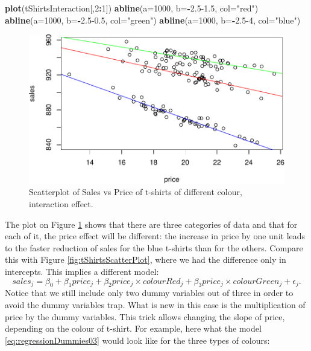 \documentclass[
]{book}
\newenvironment{Shaded}{\begin{snugshade}}{\end{snugshade}}
\newcommand{\DataTypeTok}[1]{\textcolor[rgb]{0.13,0.29,0.53}{#1}}
\newcommand{\DecValTok}[1]{\textcolor[rgb]{0.00,0.00,0.81}{#1}}
\newcommand{\FloatTok}[1]{\textcolor[rgb]{0.00,0.00,0.81}{#1}}
\newcommand{\KeywordTok}[1]{\textcolor[rgb]{0.13,0.29,0.53}{\textbf{#1}}}
\newcommand{\NormalTok}[1]{#1}
\newcommand{\OperatorTok}[1]{\textcolor[rgb]{0.81,0.36,0.00}{\textbf{#1}}}
\newcommand{\StringTok}[1]{\textcolor[rgb]{0.31,0.60,0.02}{#1}}
\theoremstyle{definition}
\theoremstyle{definition}
\theoremstyle{definition}
\theoremstyle{definition}
\theoremstyle{remark}
\begin{document}
\begin{Shaded}
\begin{Highlighting}[]
\KeywordTok{plot}\NormalTok{(tShirtsInteraction[,}\DecValTok{2}\OperatorTok{:}\DecValTok{1}\NormalTok{])}
\KeywordTok{abline}\NormalTok{(}\DataTypeTok{a=}\DecValTok{1000}\NormalTok{, }\DataTypeTok{b=}\OperatorTok{{-}}\FloatTok{2.5{-}1.5}\NormalTok{, }\DataTypeTok{col=}\StringTok{"red"}\NormalTok{)}
\KeywordTok{abline}\NormalTok{(}\DataTypeTok{a=}\DecValTok{1000}\NormalTok{, }\DataTypeTok{b=}\OperatorTok{{-}}\FloatTok{2.5{-}0.5}\NormalTok{, }\DataTypeTok{col=}\StringTok{"green"}\NormalTok{)}
\KeywordTok{abline}\NormalTok{(}\DataTypeTok{a=}\DecValTok{1000}\NormalTok{, }\DataTypeTok{b=}\OperatorTok{{-}}\FloatTok{2.5}\DecValTok{{-}4}\NormalTok{, }\DataTypeTok{col=}\StringTok{"blue"}\NormalTok{)}
\end{Highlighting}
\end{Shaded}

\begin{figure}
\centering
\includegraphics{Svetunkov---Statistics-for-Business-Analytics_files/figure-latex/tShirtsInteractionScatterPlot-1.pdf}
\caption{\label{fig:tShirtsInteractionScatterPlot}Scatterplot of Sales vs Price of t-shirts of different colour, interaction effect.}
\end{figure}

The plot on Figure \ref{fig:tShirtsInteractionScatterPlot} shows that there are three categories of data and that for each of it, the price effect will be different: the increase in price by one unit leads to the faster reduction of sales for the blue t-shirts than for the others. Compare this with Figure \ref{fig:tShirtsScatterPlot}, where we had the difference only in intercepts. This implies a different model:
\begin{equation}
    sales_j = \beta_0 + \beta_1 price_j + \beta_2 price_j \times colourRed_j + \beta_3 price_j \times colourGreen_j + \epsilon_j .
    \label{eq:regressionDummies03}
\end{equation}
Notice that we still include only two dummy variables out of three in order to avoid the dummy variables trap. What is new in this case is the multiplication of price by the dummy variables. This trick allows changing the slope of price, depending on the colour of t-shirt. For example, here what the model \eqref{eq:regressionDummies03} would look like for the three types of colours:
\end{document}
